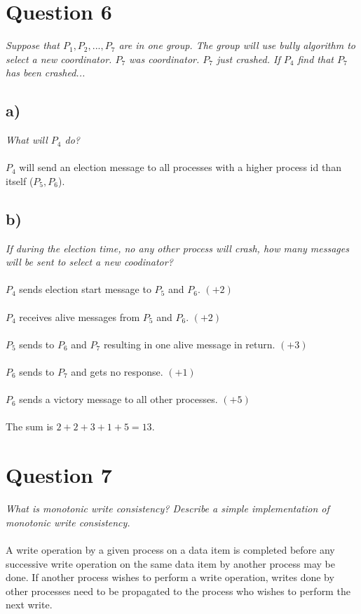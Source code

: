 \documentclass[a4paper, titlepage,12pt]{article}
\begin{document}
	\section*{Question 6}
	\emph{Suppose that $P_1, P_2, ..., P_7$ are in one group. The group will use bully algorithm to select a new coordinator. $P_7$ was coordinator. $P_7$ just crashed. If $P_4$ find that $P_7$ has been crashed...}
	\subsection*{a)}
	\emph{What will $P_4$ do?} 
\\\\
	$P_4$ will send an election message to all processes with a higher process id than itself ($P_5, P_6$).
	\subsection*{b)} \emph{If during the election time, no any other process will crash, how many messages will be sent to select a new coodinator?}
\\\\
	$P_4$ sends election start message to $P_5$ and $P_6$. $(+2)$
\\\\
	$P_4$ receives alive messages from $P_5$ and $P_6$. $(+2)$
\\\\
	$P_5$ sends to $P_6$ and $P_7$ resulting in one alive message in return. $(+3)$
\\\\
	$P_6$ sends to $P_7$ and gets no response. $(+1)$
\\\\
	$P_6$ sends a victory message to all other processes. $(+5)$
\\\\
	The sum is $2 + 2 + 3 + 1 + 5 = 13$.

	\section*{Question 7}
	\emph{What is monotonic write consistency? Describe a simple implementation of monotonic write consistency.}
\\\\
	A write operation by a given process on a data item is completed before any successive write operation on the same data item by another process may be done. If another process wishes to perform a write operation, writes done by other processes need to be propagated to the process who wishes to perform the next write.
\end{document}
